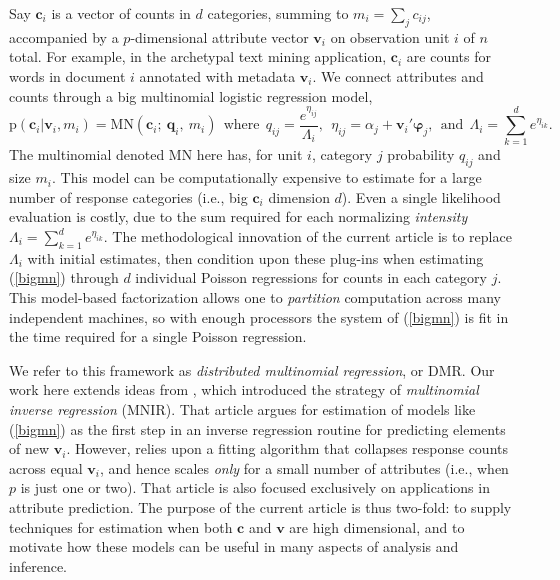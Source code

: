 \documentclass[12pt]{article}
\newcommand{\bs}[1]{\boldsymbol{#1}}
\newcommand{\mr}[1]{\mathrm{#1}}
\newcommand{\bm}[1]{\mathbf{#1}}
\begin{document}
Say $\bm{c}_i$ is a vector of counts in $d$ categories, summing to $m_i =
\sum_j c_{ij}$, accompanied by a $p$-dimensional attribute vector $\bm{v}_i$ on observation
unit $i$ of $n$ total.  For example, in the archetypal text mining application, $\bm{c}_i$
are counts for words in document $i$ annotated with metadata $\bm{v}_i$.   We
connect attributes and counts through a big multinomial logistic regression
model,
\begin{equation}\label{bigmn}
\mr{p}(\bm{c}_{i} | \bm{v}_i,m_i) = 
\mr{MN}\left(\bm{c}_i;~\bm{q}_{i}, 
~m_i\right)~~\text{where}~~q_{ij} = \frac{e^{\eta_{ij}}}{\Lambda_i},~~\eta_{ij} = \alpha_j + \bm{v}_i'\bs{\varphi}_j,~~\text{and}~~\Lambda_i = \sum_{k=1}^d e^{\eta_{ik}}.
 \end{equation} 
 The multinomial denoted $\mr{MN}$ here has, for unit $i$, category $j$
probability $q_{ij}$ and size $m_i$. This model can be computationally
expensive to estimate for a large number of response categories (i.e., big
$\bm{c}_i$ dimension $d$).  Even a single likelihood evaluation is costly, due
to the sum required for each normalizing {\it intensity} $\Lambda_i =
\sum_{k=1}^d e^{\eta_{ik}}$. The methodological innovation of the current
article is to replace $\Lambda_i$ with initial estimates, then condition upon
these plug-ins when estimating (\ref{bigmn}) through $d$ individual Poisson
regressions for counts in each category $j$. This model-based factorization
allows one to {\it partition} computation across many independent machines, so
with enough processors the system of (\ref{bigmn}) is fit in the time required
for a single Poisson regression.

We refer to this framework as {\it distributed multinomial regression}, or DMR.
Our work here extends ideas from \cite{taddy_multinomial_2013}, which
introduced the strategy of {\it multinomial inverse regression} (MNIR).  That
article argues for estimation of models like (\ref{bigmn}) as the first step
in an inverse regression routine for predicting elements of new $\bm{v}_i$.
However, \cite{taddy_multinomial_2013} relies upon a fitting algorithm that
collapses response counts across equal $\bm{v}_i$, and hence scales {\it only}
for a small number of attributes (i.e., when $p$ is just one or two). That
article is also focused exclusively on applications in attribute prediction.
The purpose of the current article is thus two-fold: to supply techniques for
estimation when both $\bm{c}$ and $\bm{v}$ are high dimensional, and to
motivate how these models can be useful in many aspects of analysis and
inference.
\end{document}

